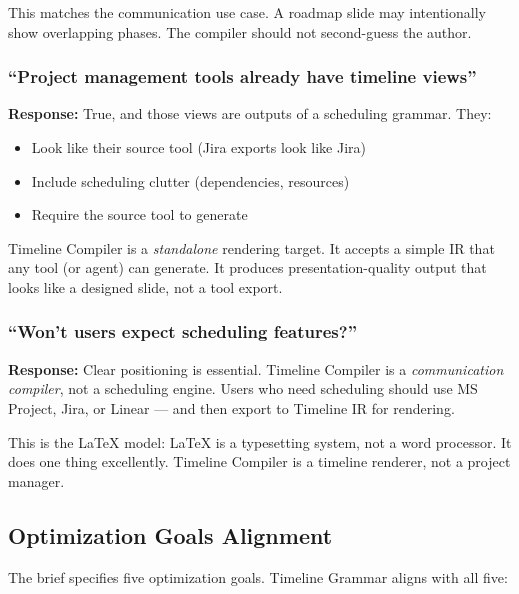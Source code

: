 This matches the communication use case. A roadmap slide may intentionally show overlapping phases. The compiler should not second-guess the author.

\subsubsection{``Project management tools already have timeline views''}

\textbf{Response:} True, and those views are outputs of a scheduling grammar. They:
\begin{itemize}
  \item Look like their source tool (Jira exports look like Jira)
  \item Include scheduling clutter (dependencies, resources)
  \item Require the source tool to generate
\end{itemize}

Timeline Compiler is a \emph{standalone} rendering target. It accepts a simple IR that any tool (or agent) can generate. It produces presentation-quality output that looks like a designed slide, not a tool export.

\subsubsection{``Won't users expect scheduling features?''}

\textbf{Response:} Clear positioning is essential. Timeline Compiler is a \emph{communication compiler}, not a scheduling engine. Users who need scheduling should use MS Project, Jira, or Linear — and then export to Timeline IR for rendering.

This is the \LaTeX{} model: \LaTeX{} is a typesetting system, not a word processor. It does one thing excellently. Timeline Compiler is a timeline renderer, not a project manager.

\subsection{Optimization Goals Alignment}

The brief specifies five optimization goals. Timeline Grammar aligns with all five:

